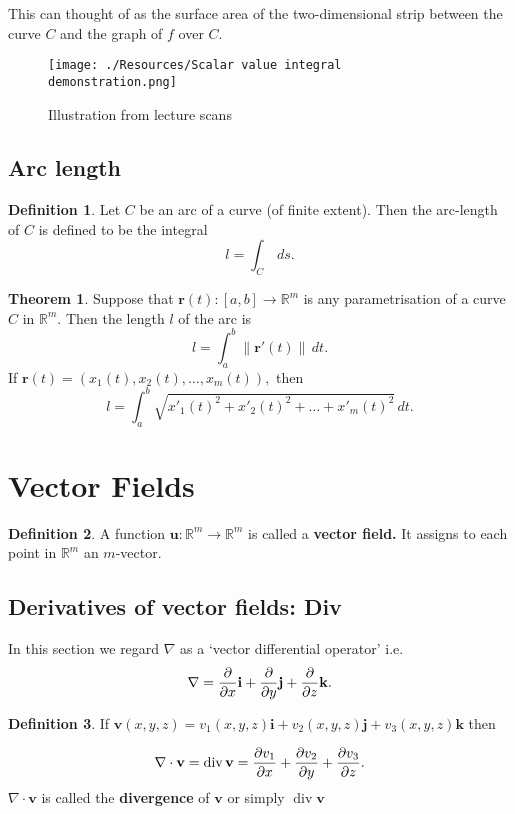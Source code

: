 \documentclass[12pt, a4paper]{article}
\newcommand{\bb}[1]{\mathbb{#1}}
\newcommand{\mb}[1]{\mathbf{#1}}
\DeclareMathOperator{\Div}{div}
\theoremstyle{definition}
\newtheorem{definition}{Definition}[section]
\newtheorem{theorem}{Theorem}[section]
\theoremstyle{plain}
\begin{document}
This can thought of as the surface area of the two-dimensional strip between the curve $C$ and the
graph of $f$ over $C.$

\begin{figure}[H]
\centering
\texttt{[image: ./Resources/Scalar value integral demonstration.png]}
\caption{Illustration from lecture scans}
\end{figure}

\subsection{Arc length}

\begin{definition}
Let $C$ be an arc of a curve (of finite extent). Then the arc-length of $C$ is defined
to be the integral $$l=\int_C\, ds.$$
\end{definition}

\begin{theorem}
Suppose that $\mb{r}(t) : [a,b] \to \bb{R}^m$ is any parametrisation of a curve $C$ in $\bb{R}^m.$ Then the length $l$ of the arc is $$l=\int_{a}^{b}\|\mb{r'}(t)\|\,dt.$$ If $\mb{r}(t)=(x_1(t),x_2(t),\ldots,x_m(t)),$ then $$l=\int_{a}^{b} \sqrt{x'_1(t)^2+x'_2(t)^2+\ldots+x'_m(t)^2} \, dt.$$
\end{theorem}

\section{Vector Fields}

\begin{definition}
A function $\mb{u} : \bb{R}^m \to \bb{R}^m$ is called a \textbf{vector field.} It assigns to each point in $\bb{R}^m$ an $m$-vector.
\end{definition}

\subsection{Derivatives of vector fields: Div}

In this section we regard $\nabla$ as a `vector differential operator' i.e. $$\nabla =\pdv{}{x}\mb{i}+\pdv{}{y}\mb{j}+\pdv{}{z}\mb{k}.$$

\begin{definition}
If $\mb{v}(x, y, z) = v_1(x, y, z)\mb{i} + v_2(x, y, z)\mb{j} + v_3(x, y, z)\mb{k}$ then
\begin{tcolorbox}
$$\nabla \cdot \mb{v}=\Div{\mb{v}}=\pdv{v_1}{x}+\pdv{v_2}{y}+\pdv{v_3}{z}.$$ $\nabla \cdot \mb{v}$ is called the \textbf{divergence} of $\mb{v}$ or simply $\Div{\mb{v}}$
\end{tcolorbox}
\end{definition}
\end{document}

